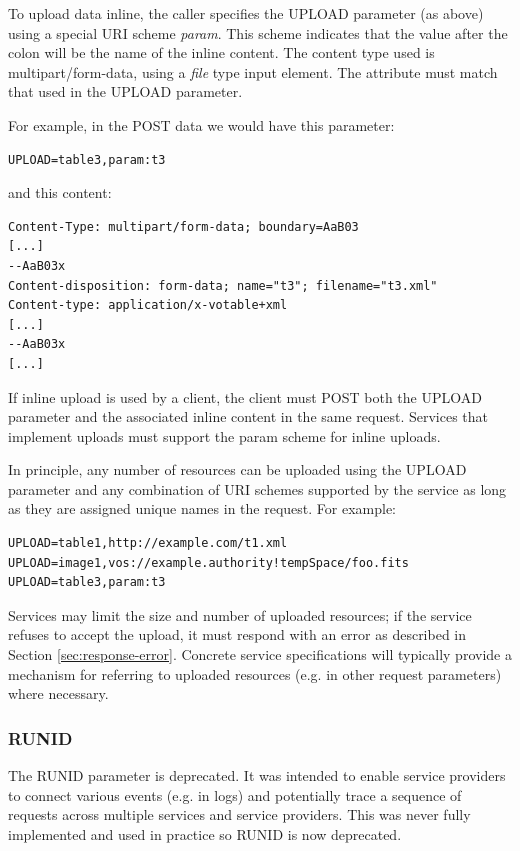 \documentclass[11pt,letter]{ivoa}
\begin{document}
To upload data inline, the caller specifies the UPLOAD parameter (as
above) using a special URI scheme \emph{param}. This scheme indicates that the value
after the colon will be the name of the inline content. The content type used is
multipart/form-data, using a \emph{file} type input element. The  attribute
must match that used in the UPLOAD parameter.

For example, in the POST data we would have this parameter:

\begin{verbatim}
UPLOAD=table3,param:t3
\end{verbatim}

and this content:

\begin{verbatim}
Content-Type: multipart/form-data; boundary=AaB03
[...]
--AaB03x
Content-disposition: form-data; name="t3"; filename="t3.xml"
Content-type: application/x-votable+xml
[...]
--AaB03x
[...]
\end{verbatim}

If inline upload is used by a client, the client must POST both the UPLOAD
parameter and the associated inline content in the same request. Services that
implement uploads must support the param scheme for inline uploads.

In principle, any number of resources can be uploaded using the UPLOAD parameter
and any combination of URI schemes supported by the service as long as they are
assigned unique names in the request. For example:

\begin{verbatim}
UPLOAD=table1,http://example.com/t1.xml
UPLOAD=image1,vos://example.authority!tempSpace/foo.fits
UPLOAD=table3,param:t3
\end{verbatim}

Services may limit the size and number of uploaded resources; if the service
refuses to accept the upload, it must respond with an error as described in
Section \ref{sec:response-error}. Concrete service specifications will
typically provide a mechanism for referring to uploaded resources (e.g. in
other request parameters) where necessary.

\subsubsection{RUNID}
The RUNID parameter is deprecated. It was intended to enable service providers
to connect various events (e.g. in logs) and potentially trace a sequence of requests
across multiple services and service providers. This was never fully implemented
and used in practice so RUNID is now deprecated.
\end{document}
